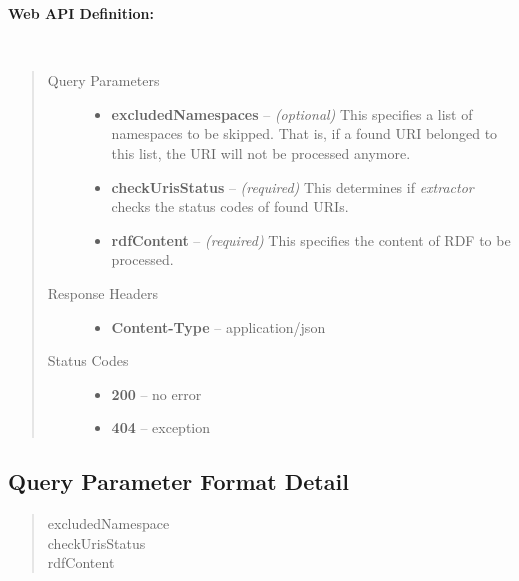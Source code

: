 \documentclass[letterpaper,10pt,english]{sphinxmanual}
\begin{document}
\textbf{Web API Definition:}


\begin{fulllineitems}
\label{user_guide:post--extractor_?excludedNamespaces, checkUrisStatus, rdfContent_}~\begin{quote}\begin{description}
\item[{Query Parameters}] \leavevmode\begin{itemize}
\item {} 
\textbf{excludedNamespaces} -- \emph{(optional)} This specifies a list of namespaces to be skipped. That is, if a found URI belonged to this list, the URI will not be processed anymore.

\item {} 
\textbf{checkUrisStatus} -- \emph{(required)} This determines if \emph{extractor} checks the status codes of found URIs.

\item {} 
\textbf{rdfContent} -- \emph{(required)} This specifies the content of RDF to be processed.

\end{itemize}

\item[{Response Headers}] \leavevmode\begin{itemize}
\item {} 
\textbf{Content-Type} -- application/json

\end{itemize}

\item[{Status Codes}] \leavevmode\begin{itemize}
\item {} 
\textbf{200} -- no error

\item {} 
\textbf{404} -- exception

\end{itemize}

\end{description}\end{quote}

\end{fulllineitems}



\subsection{Query Parameter Format Detail}
\label{user_guide:query-parameter-format-detail}\begin{quote}\begin{description}
\item[{excludedNamespace}] \leavevmode
\item[{checkUrisStatus}] \leavevmode
\item[{rdfContent}] \leavevmode
\end{description}\end{quote}
\end{document}
